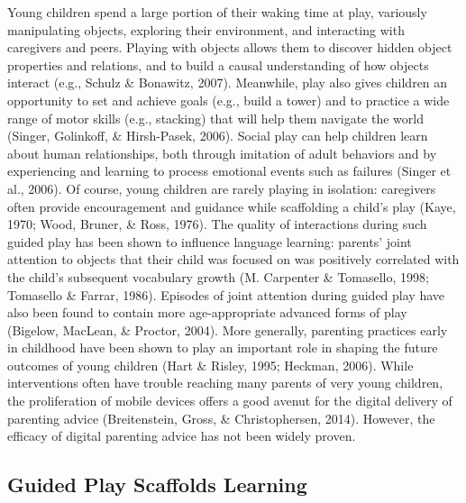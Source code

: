\documentclass[10pt, letterpaper]{article}
\begin{document}
Young children spend a large portion of their waking time at play,
variously manipulating objects, exploring their environment, and
interacting with caregivers and peers. Playing with objects allows them
to discover hidden object properties and relations, and to build a
causal understanding of how objects interact (e.g., Schulz \& Bonawitz,
2007). Meanwhile, play also gives children an opportunity to set and
achieve goals (e.g., build a tower) and to practice a wide range of
motor skills (e.g., stacking) that will help them navigate the world
(Singer, Golinkoff, \& Hirsh-Pasek, 2006). Social play can help children
learn about human relationships, both through imitation of adult
behaviors and by experiencing and learning to process emotional events
such as failures (Singer et al., 2006). Of course, young children are
rarely playing in isolation: caregivers often provide encouragement and
guidance while scaffolding a child's play (Kaye, 1970; Wood, Bruner, \&
Ross, 1976). The quality of interactions during such guided play has
been shown to influence language learning: parents' joint attention to
objects that their child was focused on was positively correlated with
the child's subsequent vocabulary growth (M. Carpenter \& Tomasello,
1998; Tomasello \& Farrar, 1986). Episodes of joint attention during
guided play have also been found to contain more age-appropriate
advanced forms of play (Bigelow, MacLean, \& Proctor, 2004). More
generally, parenting practices early in childhood have been shown to
play an important role in shaping the future outcomes of young children
(Hart \& Risley, 1995; Heckman, 2006). While interventions often have
trouble reaching many parents of very young children, the proliferation
of mobile devices offers a good avenut for the digital delivery of
parenting advice (Breitenstein, Gross, \& Christophersen, 2014).
However, the efficacy of digital parenting advice has not been widely
proven.

\subsection{Guided Play Scaffolds
Learning}\label{guided-play-scaffolds-learning}
\end{document}

